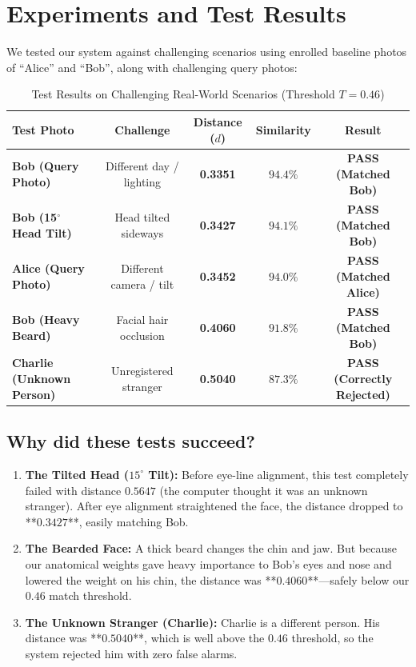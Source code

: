 \documentclass[11pt,a4paper]{article}
\begin{document}
\section{Experiments and Test Results}

We tested our system against challenging scenarios using enrolled baseline photos of ``Alice'' and ``Bob'', along with challenging query photos:

\begin{table}[htbp]
    \centering
    \caption{Test Results on Challenging Real-World Scenarios (Threshold $T = 0.46$)}
    \label{tab:results}
    \vspace{0.5em}
    \begin{tabular}{lcccc}
        \toprule
        \textbf{Test Photo} & \textbf{Challenge} & \textbf{Distance ($d$)} & \textbf{Similarity} & \textbf{Result} \\
        \midrule
        \textbf{Bob (Query Photo)} & Different day / lighting & \textbf{0.3351} & $94.4\%$ & \textbf{PASS (Matched Bob)} \\
        \textbf{Bob (15$^\circ$ Head Tilt)} & Head tilted sideways & \textbf{0.3427} & $94.1\%$ & \textbf{PASS (Matched Bob)} \\
        \textbf{Alice (Query Photo)} & Different camera / tilt & \textbf{0.3452} & $94.0\%$ & \textbf{PASS (Matched Alice)} \\
        \textbf{Bob (Heavy Beard)} & Facial hair occlusion & \textbf{0.4060} & $91.8\%$ & \textbf{PASS (Matched Bob)} \\
        \textbf{Charlie (Unknown Person)} & Unregistered stranger & \textbf{0.5040} & $87.3\%$ & \textbf{PASS (Correctly Rejected)} \\
        \bottomrule
    \end{tabular}
\end{table}

\subsection{Why did these tests succeed?}
\begin{enumerate}[leftmargin=1.5em]
    \item \textbf{The Tilted Head ($15^\circ$ Tilt):}
    Before eye-line alignment, this test completely failed with distance $0.5647$ (the computer thought it was an unknown stranger). After eye alignment straightened the face, the distance dropped to **$0.3427$**, easily matching Bob.
    \item \textbf{The Bearded Face:}
    A thick beard changes the chin and jaw. But because our anatomical weights gave heavy importance to Bob's eyes and nose and lowered the weight on his chin, the distance was **$0.4060$**—safely below our $0.46$ match threshold.
    \item \textbf{The Unknown Stranger (Charlie):}
    Charlie is a different person. His distance was **$0.5040$**, which is well above the $0.46$ threshold, so the system rejected him with zero false alarms.
\end{enumerate}
\end{document}
